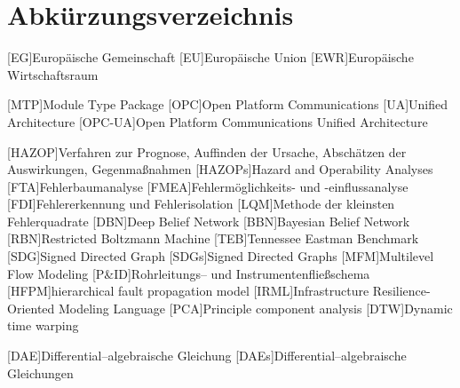 \chapter*{Abk\"urzungsverzeichnis}
\begin{acronym}[12. BImSchV] %
	[EG]{Europ\"aische Gemeinschaft} %
	[EU]{Europ\"aische Union} %
	[EWR]{Europ\"aische Wirtschaftsraum }
	
  [MTP]{Module Type Package}	
  [OPC]{Open Platform Communications}
  [UA]{Unified Architecture}
  [OPC-UA]{Open Platform Communications Unified Architecture}
	
	[HAZOP]{Verfahren zur Prognose, Auffinden der Ursache, Absch\"atzen der Auswirkungen, Gegenma\ss{}nahmen }
	[HAZOPs]{Hazard and Operability Analyses}
	[FTA]{Fehlerbaumanalyse }
	[FMEA]{Fehlerm\"oglichkeits- und -einflussanalyse }
	[FDI]{Fehlererkennung und Fehlerisolation }
	[LQM]{Methode der kleinsten Fehlerquadrate }
	[DBN]{Deep Belief Network}
	[BBN]{Bayesian Belief Network}
	[RBN]{Restricted Boltzmann Machine}
	[TEB]{Tennessee Eastman Benchmark}
	[SDG]{Signed Directed Graph}
	[SDGs]{Signed Directed Graphs}
	[MFM]{Multilevel Flow Modeling}
	[P\&{}ID]{Rohrleitungs-- und Instrumentenflie\ss{}schema }
	[HFPM]{hierarchical fault propagation model}
	[IRML]{Infrastructure Resilience-Oriented Modeling Language}
	[PCA]{Principle component analysis}
	[DTW]{Dynamic time warping}
	
	[DAE]{Differential--algebraische Gleichung }
	[DAEs]{Differential--algebraische Gleichungen }
	

\end{acronym}
